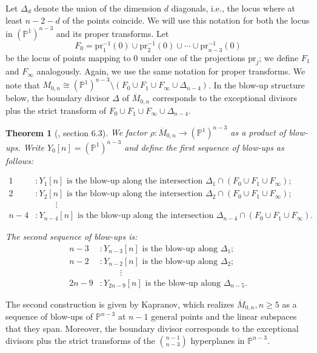 \documentclass{amsart}
\newtheorem{theorem}{Theorem}[section]
\theoremstyle{definition}
\theoremstyle{remark}
\begin{document}
Let $\Delta_d$ denote the union of the dimension $d$ diagonals, i.e., the locus where at least 
$n-2-d$ of the points coincide. We will use this notation for both the locus in $(\mathbb{P}^1)^{n-3}$ and its proper transforms. Let
\[
F_0 = \mathrm{pr}_1^{-1}(0) \cup \mathrm{pr}_2^{-1}(0) \cup \cdots \cup \mathrm{pr}_{n-3}^{-1}(0)
\]
be the locus of points mapping to $0$ under one of the projections $\mathrm{pr}_j$;
we define $F_1$ and $F_\infty$ analogously.
Again, we use the same notation for proper transforms. We note that $M_{0,n}\cong (\mathbb P^1)^{n-3}\setminus (F_0\cup F_1\cup F_\infty\cup\Delta_{n-4})$. In the blow-up structure below, the boundary divisor $\Delta$ of $\overline{M}_{0,n}$ corresponds to the exceptional divisors plus the strict transform of $F_0\cup F_1\cup F_\infty\cup\Delta_{n-4}$.


\begin{theorem}[\cite{hassett2002modulispacesweightedpointed}, section 6.3]\label{thmk}
We factor $\rho : \overline{M}_{0,n} \to (\mathbb{P}^1)^{n-3}$ as a product of blow-ups.
Write $Y_0[n] = (\mathbb{P}^1)^{n-3}$ and define the first sequence of blow-ups as follows:

\begin{align*}
1 &: Y_1[n] \text{ is the blow-up along the intersection }\Delta_1 \cap (F_0 \cup F_1 \cup F_\infty);\\
2 &: Y_2[n]\text{ is the blow-up along the intersection }\Delta_2 \cap (F_0 \cup F_1 \cup F_\infty);\\
&\hspace{1cm}\vdots\\
n-4&: Y_{n-4}[n]\text{ is the blow-up along the intersection }\Delta_{n-4} \cap (F_0 \cup F_1 \cup F_\infty).
\end{align*}

The second sequence of blow-ups is:
\begin{align*}
n-3 &:Y_{n-3}[n] \text{ is the blow-up along } \Delta_1;\\
n-2&:Y_{n-2}[n]  \text{ is the blow-up along } \Delta_2;\\
&\hspace{1cm}\vdots\\
2n-9&:Y_{2n-9}[n]    \text{ is the blow-up along } \Delta_{n-5}.
\end{align*}

\end{theorem}

The second construction is given by Kapranov, which realizes $\overline{M}_{0,n}, n\geq5$ as a sequence of blow-ups of $\mathbb{P}^{n-3}$ at $n-1$ general points and the linear subspaces that they span. Moreover, the boundary divisor corresponds to the exceptional divisors plus the strict transforms of the $\binom{n-1}{n-3}$ hyperplanes in $\mathbb{P}^{n-3}$.
\end{document}

